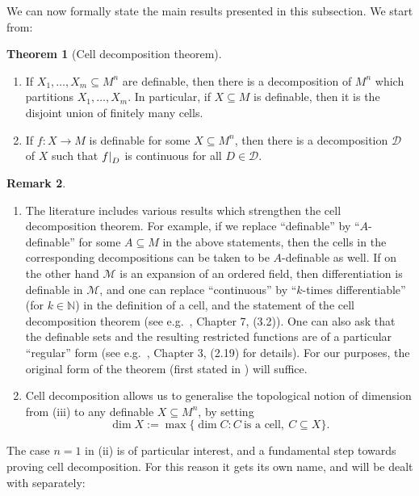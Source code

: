 \documentclass[a4paper]{report}
\newcommand{\ind}{\hspace{15pt}}
\newcommand{\Nat}{\mathbb{N}}
\newcommand{\D}{\mathcal{D}}
\newcommand{\M}{\mathcal{M}}
\newcommand\restr[2]{{\left.\kern-\nulldelimiterspace#1\right|_{#2}}}
\theoremstyle{definition}
\newtheorem{thm}{Theorem}[chapter]
\theoremstyle{remstyle}
\newtheorem{rem}[thm]{Remark}
\begin{document}
\ind We can now formally state the main results presented in this subsection. We start from:

\begin{thm}[Cell decomposition theorem]\label{celldec}\
	\begin{enumerate}
		\item  If $X_1,\ldots,X_m\subseteq M^n$ are definable, then there is a decomposition of $M^n$ which partitions $X_1,\ldots,X_m$. In particular, if $X\subseteq M$ is definable, then it is the disjoint union of finitely many cells.
		\item If $f:X\to M$ is definable for some $X\subseteq M^n$, then there is a decomposition $\D$ of $X$ such that $\restr{f}{D}$ is continuous for all $D\in\D$.
	\end{enumerate}
\end{thm}

\begin{rem}\label{celldecrem}\
	\begin{enumerate}
		\item The literature includes various results which strengthen the cell decomposition theorem. For example, if we replace ``definable'' by ``$A$-definable'' for some $A\subseteq M$ in the above statements, then the cells in the corresponding decompositions can be taken to be $A$-definable as well. If on the other hand $\M$ is an expansion of an ordered field, then differentiation is definable in $\M$, and one can replace ``continuous'' by ``$k$-times differentiable'' (for $k\in\Nat$) in the definition of a cell, and the statement of the cell decomposition theorem (see e.g.\ \cite{tame}, Chapter 7, (3.2)). One can also ask that the definable sets and the resulting restricted functions are of a particular ``regular'' form (see e.g.\ \cite{tame}, Chapter 3, (2.19) for details). For our purposes, the original form of the theorem (first stated in \cite{defII}) will suffice.
		\item Cell decomposition allows us to generalise the topological notion of dimension from  (iii) to any definable $X\subseteq M^n$, by setting
		      \begin{equation*}
			      \dim X:=\max\{\dim C: C\ \text{is a cell},\ C\subseteq X\}.
		      \end{equation*}
	\end{enumerate}
\end{rem}

\ind The case $n=1$ in  (ii) is of particular interest, and a fundamental step towards proving cell decomposition. For this reason it gets its own name, and will be dealt with separately:
\end{document}
